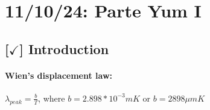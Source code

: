 \section{11/10/24: Parte Yum I}

\subsection{[$\checkmark$] Introduction}

\paragraph{Wien's displacement law:} $\lambda_{peak} = \frac{b}{T}$, where $b = 2.898*10^{-3} mK$ or $b = 2898 \mu m K$
